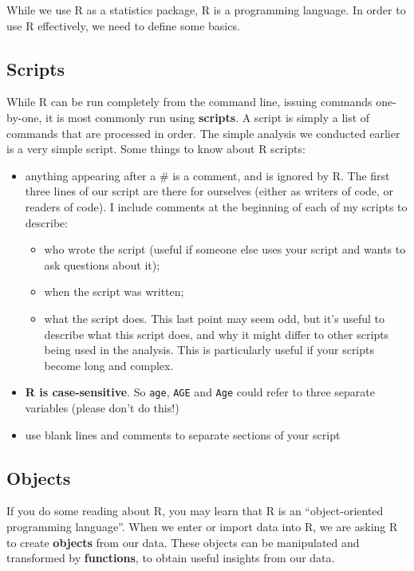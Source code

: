 \documentclass[
]{memoir}
\begin{document}
While we use R as a statistics package, R is a programming language. In order to use R effectively, we need to define some basics.

\hypertarget{scripts}{%
\subsection{Scripts}\label{scripts}}

While R can be run completely from the command line, issuing commands one-by-one, it is most commonly run using \textbf{scripts}. A script is simply a list of commands that are processed in order. The simple analysis we conducted earlier is a very simple script. Some things to know about R scripts:

\begin{itemize}
\item
  anything appearing after a \# is a comment, and is ignored by R. The first three lines of our script are there for ourselves (either as writers of code, or readers of code). I include comments at the beginning of each of my scripts to describe:

  \begin{itemize}
  \item
    who wrote the script (useful if someone else uses your script and wants to ask questions about it);
  \item
    when the script was written;
  \item
    what the script does. This last point may seem odd, but it's useful to describe what this script does, and why it might differ to other scripts being used in the analysis. This is particularly useful if your scripts become long and complex.
  \end{itemize}
\item
  \textbf{R is case-sensitive}. So \texttt{age}, \texttt{AGE} and \texttt{Age} could refer to three separate variables (please don't do this!)
\item
  use blank lines and comments to separate sections of your script
\end{itemize}

\hypertarget{objects}{%
\subsection{Objects}\label{objects}}

If you do some reading about R, you may learn that R is an ``object-oriented programming language''. When we enter or import data into R, we are asking R to create \textbf{objects} from our data. These objects can be manipulated and transformed by \textbf{functions}, to obtain useful insights from our data.
\end{document}
